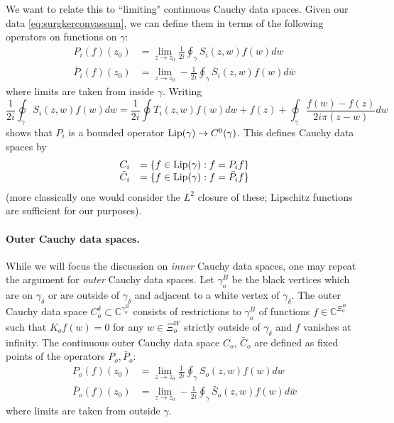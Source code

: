 \documentclass[10pt]{article}
\newcommand{\C}{\mathbb{C}}
\begin{document}
We want to relate this to ``limiting" continuous Cauchy data spaces. Given our data \eqref{eq:surgkerconvassum}, we can define them in terms of the following operators on functions on $\gamma$:
\begin{equation}\label{eq:surgcontcald}
\begin{array}{rl}
P_i(f)(z_0)&=\lim_{z\rightarrow z_0} \frac 1{2i}\oint_\gamma S_i(z,w)f(w)dw\\
\bar P_i(f)(z_0)&=\lim_{z\rightarrow z_0} -\frac 1{2i}\oint_\gamma\bar S_i(z,w)f(w)d\bar w
\end{array}
\end{equation}
where limits are taken from inside $\gamma$. Writing
$$\frac 1{2i}\oint_\gamma S_i(z,w)f(w)dw=\frac 1{2i}\oint T_i(z,w)f(w)dw+f(z)+\oint_\gamma \frac{f(w)-f(z)}{2i\pi(z-w)}dw$$
shows that $P_i$ is a bounded operator ${\rm Lip}(\gamma)\rightarrow C^0(\gamma)$. This defines Cauchy data spaces by 
 \begin{equation}\label{eg:surgcontdata}
 \begin{array}{rl}
 C_i&=\{f\in{\rm Lip}(\gamma):f=P_if\}\\
 \bar C_i&=\{f\in{\rm Lip}(\gamma):f=\bar P_if\}
 \end{array}
 \end{equation} 
 (more classically one would consider the $L^2$ closure of these; Lipschitz functions are sufficient for our purposes).
 
\paragraph{Outer Cauchy data spaces.} 
While we will focus the discussion on {\em inner} Cauchy data spaces, one may repeat the argument for {\em outer} Cauchy data spaces. 
%
Let $\gamma^B_o$ be the black vertices which are on $\gamma_\delta$ or are outside of $\gamma_\delta$ and adjacent to a white vertex of $\gamma_\delta$. The outer Cauchy data space $C_o^\delta\subset\C^{\gamma^B_o}$ consists of restrictions to $\gamma^B_o$ of functions $f\in\C^{\Xi^B_o}$ such that $K_o f(w)=0$ for any $w\in \Xi^W_o$ strictly outside of $\gamma_\delta$ and $f$ vanishes at infinity. The continuous outer Cauchy data space $C_o$, $\bar C_o$ are defined as fixed points of the operators $P_o, \bar P_o$:
\begin{align*}
P_o(f)(z_0)&=\lim_{z\rightarrow z_0} \frac 1{2i}\oint_{\gamma}S_o(z,w)f(w)dw\\
\bar P_o(f)(z_0)&=\lim_{z\rightarrow z_0} -\frac 1{2i}\oint_{\gamma}\bar S_o(z,w)f(w)d\bar w
\end{align*} 
where limits are taken from outside $\gamma$. 
\end{document}
